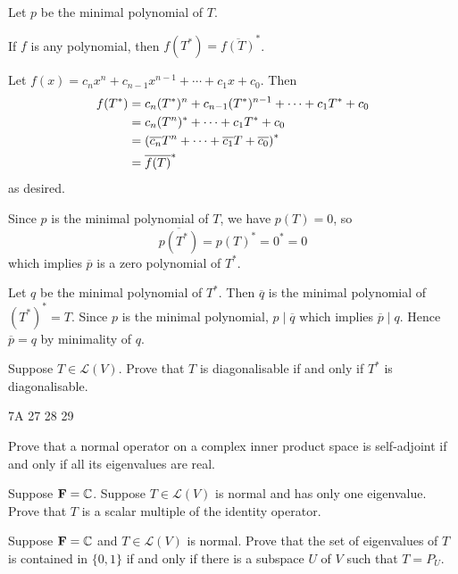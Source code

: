 \begin{solution}
Let $p$ be the minimal polynomial of $T$.
\begin{claim}
If $f$ is any polynomial, then $f(T^*)=\overline{f(T)}^*$.
\end{claim}
Let $f(x)=c_nx^n+c_{n-1}x^{n-1}+\cdots+c_1x+c_0$. Then
\begin{align*}
f(T^*)&=c_n(T^*)^n+c_{n-1}(T^*)^{n-1}+\cdots+c_1T^*+c_0\\
&=c_n(T^n)^*+\cdots+c_1T^*+c_0\\
&=\left(\overline{c_n}T^n+\cdots+\overline{c_1}T+\overline{c_0}\right)^*\\
&=\overline{f(T)}^*
\end{align*}
as desired.

Since $p$ is the minimal polynomial of $T$, we have $p(T)=0$, so
\[\overline{p(T^*)}=p(T)^*=0^*=0\]
which implies $\overline{p}$ is a zero polynomial of $T^*$.

Let $q$ be the minimal polynomial of $T^*$. 
Then $\overline{q}$ is the minimal polynomial of $(T^*)^*=T$. 
Since $p$ is the minimal polynomial, $p\mid\overline{q}$ which implies $\overline{p}\mid q$. 
Hence $\overline{p}=q$ by minimality of $q$.
\end{solution}

\begin{exercise}
Suppose $T\in\mathcal{L}(V)$. Prove that $T$ is diagonalisable if and only if $T^*$ is diagonalisable.
\end{exercise}

\begin{solution}

\end{solution}

7A 27 28 29

\begin{exercise}
Prove that a normal operator on a complex inner product space is self-adjoint if and only if all its eigenvalues are real.
\end{exercise}

\begin{exercise}
Suppose $\mathbf F=\mathbb C$. Suppose $T\in\mathcal{L}(V)$ is normal and has only one eigenvalue. Prove that $T$ is a scalar multiple of the identity operator.
\end{exercise}

\begin{exercise}
Suppose $\mathbf F=\mathbb C$ and $T\in\mathcal{L}(V)$ is normal. Prove that the set of eigenvalues of $T$ is contained in $\{0,1\}$ if and only if there is a subspace $U$ of $V$ such that $T=P_U$.
\end{exercise}

